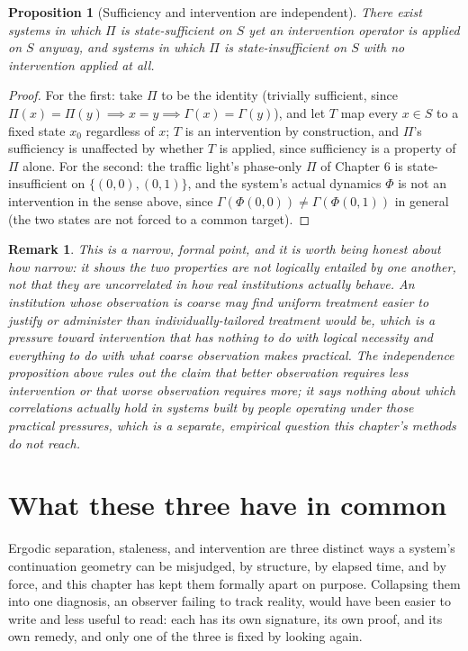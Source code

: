 \documentclass[11pt]{report}
\newtheorem{proposition}{Proposition}[chapter]
\newtheorem{remark}{Remark}[chapter]
\begin{document}
\begin{proposition}[Sufficiency and intervention are independent]
There exist systems in which $\Pi$ is state-sufficient on $S$ yet an
intervention operator is applied on $S$ anyway, and systems in which
$\Pi$ is state-insufficient on $S$ with no intervention applied at
all.
\end{proposition}
\begin{proof}
For the first: take $\Pi$ to be the identity (trivially sufficient,
since $\Pi(x)=\Pi(y) \implies x=y \implies \Gamma(x)=\Gamma(y)$), and
let $T$ map every $x \in S$ to a fixed state $x_0$ regardless of $x$;
$T$ is an intervention by construction, and $\Pi$'s sufficiency is
unaffected by whether $T$ is applied, since sufficiency is a property
of $\Pi$ alone. For the second: the traffic light's phase-only $\Pi$
of Chapter 6 is state-insufficient on $\{(0,0),(0,1)\}$, and the
system's actual dynamics $\Phi$ is not an intervention in the sense
above, since $\Gamma(\Phi(0,0)) \neq \Gamma(\Phi(0,1))$ in general
(the two states are not forced to a common target).
\end{proof}

\begin{remark}
This is a narrow, formal point, and it is worth being honest about how
narrow: it shows the two properties are not logically entailed by one
another, not that they are uncorrelated in how real institutions
actually behave. An institution whose observation is coarse may find
uniform treatment easier to justify or administer than
individually-tailored treatment would be, which is a pressure toward
intervention that has nothing to do with logical necessity and
everything to do with what coarse observation makes practical. The
independence proposition above rules out the claim that better
observation \emph{requires} less intervention or that worse
observation \emph{requires} more; it says nothing about which
correlations actually hold in systems built by people operating under
those practical pressures, which is a separate, empirical question
this chapter's methods do not reach.
\end{remark}

\section*{What these three have in common}

Ergodic separation, staleness, and intervention are three distinct
ways a system's continuation geometry can be misjudged, by structure,
by elapsed time, and by force, and this chapter has kept them formally
apart on purpose. Collapsing them into one diagnosis, an observer
failing to track reality, would have been easier to write and less
useful to read: each has its own signature, its own proof, and its
own remedy, and only one of the three is fixed by looking again.
\end{document}
